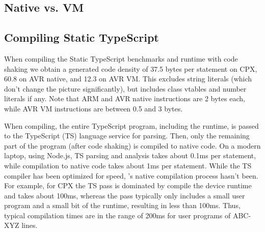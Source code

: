 

\subsection{\MC Native vs. \MC VM}

\subsection{Compiling Static TypeScript}


When compiling the Static TypeScript benchmarks and runtime with code shaking we obtain
a generated code density of 37.5 bytes per statement on CPX, 60.8 on AVR native, and 12.3 on AVR VM.
This excludes string literals (which don't change the picture significantly), but includes class
vtables and number literals if any. Note that ARM and AVR native instructions are 2 bytes each,
while AVR VM instructions are between 0.5 and 3 bytes.

When compiling, the entire TypeScript program, including the runtime, is
passed to the TypeScript (TS) language service for parsing. Then, only the remaining
part of the program (after code shaking) is compiled to native code.
On a modern laptop, using Node.js, TS parsing and analysis takes about 0.1ms per statement,
while \MC compilation to native code takes about 1ms per statement.
While the TS compiler has been optimized for speed,
\MCN's native compilation process hasn't been.
For example, for CPX the TS pass is dominated by compile the device runtime
and takes about 100ms, whereas the \MC pass typically only includes a small user program
and a small bit of the runtime, resulting in less than 100ms.
Thus, typical compilation times are in the range of 200ms for user programs
of ABC-XYZ lines.

